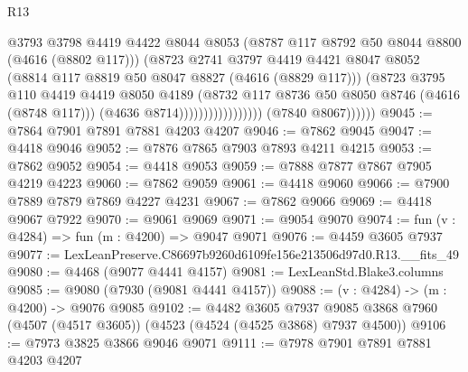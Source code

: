 \begin{lexlean}{R13}
\begin{coremodule}
                                          @3793
                                          @3798
                                          @4419
                                          @4422
                                          @8044
                                          @8053
                                          (@8787 @117 @8792 @50 @8044 @8800 (@4616 (@8802 @117)))
                                          (@8723
                                            @2741
                                            @3797
                                            @4419
                                            @4421
                                            @8047
                                            @8052
                                            (@8814 @117 @8819 @50 @8047 @8827 (@4616 (@8829 @117)))
                                            (@8723
                                              @3795
                                              @110
                                              @4419
                                              @4419
                                              @8050
                                              @4189
                                              (@8732
                                                @117
                                                @8736
                                                @50
                                                @8050
                                                @8746
                                                (@4616 (@8748 @117)))
                                              (@4636 @8714)))))))))))))))))
              (@7840 @8067))))))
@9045 := @7864 @7901 @7891 @7881 @4203 @4207
@9046 := @7862 @9045
@9047 := @4418 @9046
@9052 := @7876 @7865 @7903 @7893 @4211 @4215
@9053 := @7862 @9052
@9054 := @4418 @9053
@9059 := @7888 @7877 @7867 @7905 @4219 @4223
@9060 := @7862 @9059
@9061 := @4418 @9060
@9066 := @7900 @7889 @7879 @7869 @4227 @4231
@9067 := @7862 @9066
@9069 := @4418 @9067 @7922
@9070 := @9061 @9069
@9071 := @9054 @9070
@9074 := fun (v : @4284) => fun (m : @4200) => @9047 @9071
@9076 := @4459 @3605 @7937
@9077 := LexLeanPreserve.C86697b9260d6109fe156e213506d97d0.R13.__fits_49
@9080 := @4468 (@9077 @4441 @4157)
@9081 := LexLeanStd.Blake3.columns
@9085 := @9080 (@7930 (@9081 @4441 @4157))
@9088 := (v : @4284) -> (m : @4200) -> @9076 @9085
@9102 := @4482
    @3605
    @7937
    @9085
    @3868
    @7960
    (@4507 (@4517 @3605))
    (@4523 (@4524 (@4525 @3868) @7937 @4500))
@9106 := @7973 @3825 @3866 @9046 @9071
@9111 := @7978 @7901 @7891 @7881 @4203 @4207

\end{coremodule}
\end{lexlean}
